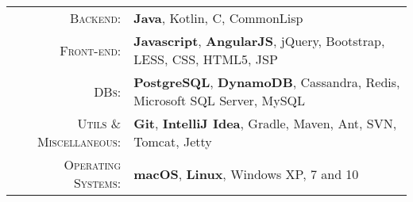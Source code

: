 %
%
%

\renewcommand{\arraystretch}{1.1}

	\begin{tabular}{>{}r>{}p{13cm}} 
		\textsc{Backend:} &
			\textbf{Java}, Kotlin, C, CommonLisp \\
		\textsc{Front-end:} &
			\textbf{Javascript}, \textbf{AngularJS}, jQuery, Bootstrap, LESS, CSS, HTML5, JSP \\ 
		\textsc{DBs:} & 
			\textbf{PostgreSQL}, \textbf{DynamoDB}, Cassandra, Redis, Microsoft SQL Server, MySQL \\ 
		\textsc{Utils \& Miscellaneous:} &
			\textbf{Git}, \textbf{IntelliJ Idea}, Gradle, Maven, Ant, SVN, Tomcat, Jetty \\
		\textsc{Operating Systems:} &
			\textbf{macOS}, \textbf{Linux}, Windows XP, 7 and 10 \\ 
	\end{tabular}